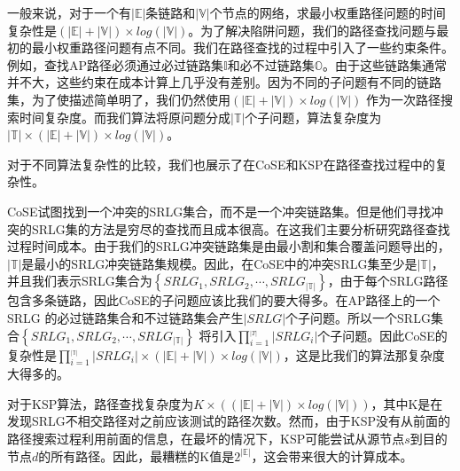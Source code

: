 一般来说，对于一个有$|\mathbb{E}|$条链路和$|\mathbb{V}|$个节点的网络，求最小权重路径问题的时间复杂性是$(|\mathbb{E}|+|\mathbb{V}|)\times log(|\mathbb{V}|)$。为了解决陷阱问题，我们的路径查找问题与最初的最小权重路径问题有点不同。我们在路径查找的过程中引入了一些约束条件。例如，查找AP路径必须通过必过链路集$\mathbb{I}$和必不过链路集$\mathbb{O}$。由于这些链路集通常并不大，这些约束在成本计算上几乎没有差别。因为不同的子问题有不同的链路集，为了使描述简单明了，我们仍然使用$(|\mathbb{E}|+|\mathbb{V}|)\times log(|\mathbb{V}|)$ 作为一次路径搜索时间复杂度。而我们算法将原问题分成$|\mathbb{T}|$个子问题，算法复杂度为$|\mathbb{T}|\times(|\mathbb{E}|+|\mathbb{V}|)\times log(|\mathbb{V}|)$。


对于不同算法复杂性的比较，我们也展示了在CoSE\cite{rostami2007cose}和KSP\cite{eppstein1998finding}在路径查找过程中的复杂性。

CoSE试图找到一个冲突的SRLG集合，而不是一个冲突链路集。但是他们寻找冲突的SRLG集的方法是穷尽的查找而且成本很高。在这我们主要分析研究路径查找过程时间成本。由于我们的SRLG冲突链路集是由最小割和集合覆盖问题导出的，$|\mathbb{T}|$是最小的SRLG冲突链路集规模。因此，在CoSE中的冲突SRLG集至少是$|\mathbb{T}|$，并且我们表示SRLG集合为$\left\{ {SRL{G_1},SRL{G_2}, \cdots ,SRL{G_{|\mathbb{T}|}}} \right\}$，由于每个SRLG路径包含多条链路，因此CoSE的子问题应该比我们的要大得多。在AP路径上的一个SRLG 的必过链路集合和不过链路集会产生$|SRLG|$个子问题。所以一个SRLG集合$\left\{ {SRL{G_1},SRL{G_2}, \cdots ,SRL{G_{|\mathbb{T}|}}} \right\}$ 将引入$\prod\limits_{i = 1}^{_{\left| T \right|}} {\left| {SRL{G_i}} \right|}$个子问题。因此CoSE的复杂性是$\prod\limits_{i = 1}^{_{|\mathbb{T}|}} {\left| {SRL{G_i}} \right|}\times (|\mathbb{E}|+|\mathbb{V}|)\times log(|\mathbb{V}|)$，这是比我们的算法那复杂度大得多的。

对于KSP算法\cite{eppstein1998finding}，路径查找复杂度为$K\times ((|\mathbb{E}|+|\mathbb{V}|)\times log(|\mathbb{V}|))$，其中K是在发现SRLG不相交路径对之前应该测试的路径次数。然而，由于KSP没有从前面的路径搜索过程利用前面的信息，在最坏的情况下，KSP可能尝试从源节点$s$到目的节点$d$的所有路径。因此，最糟糕的K值是$2^{|\mathbb{E}|}$，这会带来很大的计算成本。

